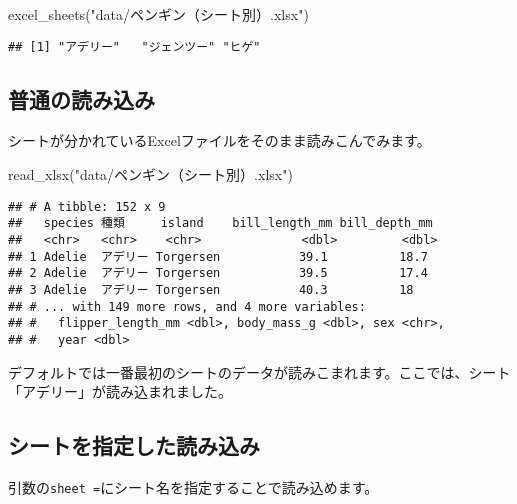 \documentclass[
  xelatex,ja=standard, b5paper]{bxjsbook}
\newenvironment{Shaded}{\begin{snugshade}}{\end{snugshade}}
\newcommand{\FunctionTok}[1]{\textcolor[rgb]{0.00,0.00,0.00}{#1}}
\newcommand{\NormalTok}[1]{#1}
\newcommand{\StringTok}[1]{\textcolor[rgb]{0.31,0.60,0.02}{#1}}
\begin{document}
\begin{Shaded}
\begin{Highlighting}[]
\FunctionTok{excel\_sheets}\NormalTok{(}\StringTok{"data/ペンギン（シート別）.xlsx"}\NormalTok{)}
\end{Highlighting}
\end{Shaded}

\begin{verbatim}
## [1] "アデリー"   "ジェンツー" "ヒゲ"
\end{verbatim}

\hypertarget{ux666eux901aux306eux8aadux307fux8fbcux307f}{%
\subsection{普通の読み込み}\label{ux666eux901aux306eux8aadux307fux8fbcux307f}}

シートが分かれているExcelファイルをそのまま読みこんでみます。

\begin{Shaded}
\begin{Highlighting}[]
\FunctionTok{read\_xlsx}\NormalTok{(}\StringTok{"data/ペンギン（シート別）.xlsx"}\NormalTok{)}
\end{Highlighting}
\end{Shaded}

\begin{verbatim}
## # A tibble: 152 x 9
##   species 種類     island    bill_length_mm bill_depth_mm
##   <chr>   <chr>    <chr>              <dbl>         <dbl>
## 1 Adelie  アデリー Torgersen           39.1          18.7
## 2 Adelie  アデリー Torgersen           39.5          17.4
## 3 Adelie  アデリー Torgersen           40.3          18  
## # ... with 149 more rows, and 4 more variables:
## #   flipper_length_mm <dbl>, body_mass_g <dbl>, sex <chr>,
## #   year <dbl>
\end{verbatim}

デフォルトでは一番最初のシートのデータが読みこまれます。ここでは、シート「アデリー」が読み込まれました。

\hypertarget{ux30b7ux30fcux30c8ux3092ux6307ux5b9aux3057ux305fux8aadux307fux8fbcux307f}{%
\subsection{シートを指定した読み込み}\label{ux30b7ux30fcux30c8ux3092ux6307ux5b9aux3057ux305fux8aadux307fux8fbcux307f}}

引数の\texttt{sheet\ =}にシート名を指定することで読み込めます。
\end{document}
